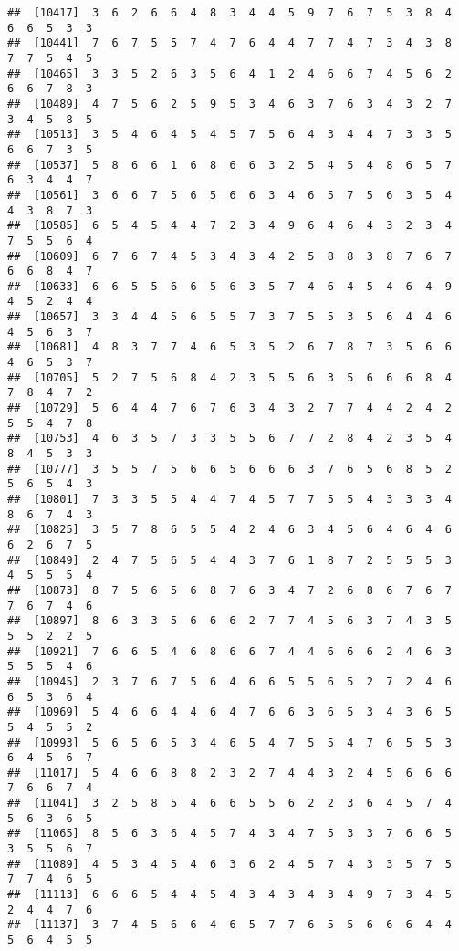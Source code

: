 \documentclass[
]{book}
\begin{document}
\begin{verbatim}
##  [10417]  3  6  2  6  6  4  8  3  4  4  5  9  7  6  7  5  3  8  4  6  6  5  3  3
##  [10441]  7  6  7  5  5  7  4  7  6  4  4  7  7  4  7  3  4  3  8  7  7  5  4  5
##  [10465]  3  3  5  2  6  3  5  6  4  1  2  4  6  6  7  4  5  6  2  6  6  7  8  3
##  [10489]  4  7  5  6  2  5  9  5  3  4  6  3  7  6  3  4  3  2  7  3  4  5  8  5
##  [10513]  3  5  4  6  4  5  4  5  7  5  6  4  3  4  4  7  3  3  5  6  6  7  3  5
##  [10537]  5  8  6  6  1  6  8  6  6  3  2  5  4  5  4  8  6  5  7  6  3  4  4  7
##  [10561]  3  6  6  7  5  6  5  6  6  3  4  6  5  7  5  6  3  5  4  4  3  8  7  3
##  [10585]  6  5  4  5  4  4  7  2  3  4  9  6  4  6  4  3  2  3  4  7  5  5  6  4
##  [10609]  6  7  6  7  4  5  3  4  3  4  2  5  8  8  3  8  7  6  7  6  6  8  4  7
##  [10633]  6  6  5  5  6  6  5  6  3  5  7  4  6  4  5  4  6  4  9  4  5  2  4  4
##  [10657]  3  3  4  4  5  6  5  5  7  3  7  5  5  3  5  6  4  4  6  4  5  6  3  7
##  [10681]  4  8  3  7  7  4  6  5  3  5  2  6  7  8  7  3  5  6  6  4  6  5  3  7
##  [10705]  5  2  7  5  6  8  4  2  3  5  5  6  3  5  6  6  6  8  4  7  8  4  7  2
##  [10729]  5  6  4  4  7  6  7  6  3  4  3  2  7  7  4  4  2  4  2  5  5  4  7  8
##  [10753]  4  6  3  5  7  3  3  5  5  6  7  7  2  8  4  2  3  5  4  8  4  5  3  3
##  [10777]  3  5  5  7  5  6  6  5  6  6  6  3  7  6  5  6  8  5  2  5  6  5  4  3
##  [10801]  7  3  3  5  5  4  4  7  4  5  7  7  5  5  4  3  3  3  4  8  6  7  4  3
##  [10825]  3  5  7  8  6  5  5  4  2  4  6  3  4  5  6  4  6  4  6  6  2  6  7  5
##  [10849]  2  4  7  5  6  5  4  4  3  7  6  1  8  7  2  5  5  5  3  4  5  5  5  4
##  [10873]  8  7  5  6  5  6  8  7  6  3  4  7  2  6  8  6  7  6  7  7  6  7  4  6
##  [10897]  8  6  3  3  5  6  6  6  2  7  7  4  5  6  3  7  4  3  5  5  5  2  2  5
##  [10921]  7  6  6  5  4  6  8  6  6  7  4  4  6  6  6  2  4  6  3  5  5  5  4  6
##  [10945]  2  3  7  6  7  5  6  4  6  6  5  5  6  5  2  7  2  4  6  6  5  3  6  4
##  [10969]  5  4  6  6  4  4  6  4  7  6  6  3  6  5  3  4  3  6  5  5  4  5  5  2
##  [10993]  5  6  5  6  5  3  4  6  5  4  7  5  5  4  7  6  5  5  3  6  4  5  6  7
##  [11017]  5  4  6  6  8  8  2  3  2  7  4  4  3  2  4  5  6  6  6  7  6  6  7  4
##  [11041]  3  2  5  8  5  4  6  6  5  5  6  2  2  3  6  4  5  7  4  5  6  3  6  5
##  [11065]  8  5  6  3  6  4  5  7  4  3  4  7  5  3  3  7  6  6  5  3  5  5  6  7
##  [11089]  4  5  3  4  5  4  6  3  6  2  4  5  7  4  3  3  5  7  5  7  7  4  6  5
##  [11113]  6  6  6  5  4  4  5  4  3  4  3  4  3  4  9  7  3  4  5  2  4  4  7  6
##  [11137]  3  7  4  5  6  6  4  6  5  7  7  6  5  5  6  6  6  4  4  5  6  4  5  5

\end{verbatim}
\end{document}
